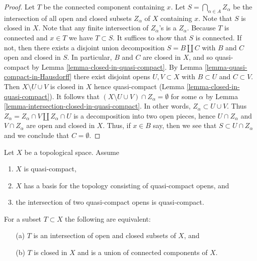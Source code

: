 \begin{proof}
Let $T$ be the connected component containing $x$.
Let $S = \bigcap_{\alpha \in A} Z_\alpha$ be the intersection of all
open and closed subsets $Z_\alpha$ of $X$ containing $x$.
Note that $S$ is closed in $X$.
Note that any finite intersection of $Z_\alpha$'s is a $Z_\alpha$.
Because $T$ is connected and $x \in T$ we have $T \subset S$.
It suffices to show that $S$ is connected.
If not, then there exists a disjoint union decomposition
$S = B \amalg C$ with $B$ and $C$ open and closed in $S$.
In particular, $B$ and $C$ are closed in $X$, and so quasi-compact by
Lemma \ref{lemma-closed-in-quasi-compact}.
By Lemma \ref{lemma-quasi-compact-in-Hausdorff}
there exist disjoint opens $U, V \subset X$ with $B \subset U$ and
$C \subset V$. Then $X \setminus U \cup V$ is closed in $X$
hence quasi-compact (Lemma \ref{lemma-closed-in-quasi-compact}).
It follows that $(X \setminus U \cup V) \cap Z_\alpha = \emptyset$
for some $\alpha$ by Lemma \ref{lemma-intersection-closed-in-quasi-compact}.
In other words, $Z_\alpha \subset U \cup V$. Thus
$Z_\alpha = Z_\alpha \cap V \amalg Z_\alpha \cap U$
is a decomposition into two open pieces,
hence $U \cap Z_\alpha$ and $V \cap Z_\alpha$ are open and closed in $X$.
Thus, if $x \in B$ say, then we see that $S \subset U \cap Z_\alpha$
and we conclude that $C = \emptyset$.
\end{proof}

\begin{lemma}
\label{lemma-closed-union-connected-components}
Let $X$ be a topological space.
Assume
\begin{enumerate}
\item $X$ is quasi-compact,
\item $X$ has a basis for the topology consisting of quasi-compact opens, and
\item the intersection of two quasi-compact opens is quasi-compact.
\end{enumerate}
For a subset $T \subset X$ the following are equivalent:
\begin{enumerate}
\item[(a)] $T$ is an intersection of open and closed subsets of $X$, and
\item[(b)] $T$ is closed in $X$ and is a union of connected components of $X$.
\end{enumerate}
\end{lemma}


